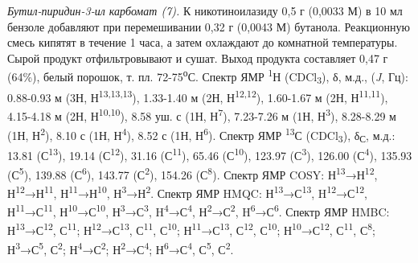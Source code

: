 \emph{Бутил-пиридин-3-ил карбомат (7).} К никотиноилазиду 0,5 г (0,0033
М) в 10 мл бензоле добавляют при перемешивании 0,32 г (0,0043 М)
бутанола. Реакционную смесь кипятят в течение 1 часа, а затем охлаждают
до комнатной температуры. Сырой продукт отфильтровывают и сушат. Выход
продукта составляет 0,47 г (64\%), белый порошок, т. пл.
72-75\textsuperscript{о}С. Спектр ЯМР \textsuperscript{1}Н
(CDCl\textsubscript{3}), δ, м.д., (\emph{J}, Гц): 0.88-0.93 м (3Н,
Н\textsuperscript{13,13,13}), 1.33-1.40 м (2Н,
Н\textsuperscript{12,12}), 1.60-1.67 м (2Н, Н\textsuperscript{11,11}),
4.15-4.18 м (2Н, Н\textsuperscript{10,10}), 8.58 уш. с (1Н,
Н\textsuperscript{7}), 7.23-7.26 м (1Н, Н\textsuperscript{3}), 8.28-8.29
м (1Н, Н\textsuperscript{2}), 8.10 с (1Н, Н\textsuperscript{4}), 8.52 с
(1Н, Н\textsuperscript{6}). Спектр ЯМР \textsuperscript{13}С
(CDCl\textsubscript{3}), δ\textsubscript{С}, м.д.: 13.81
(С\textsuperscript{13}), 19.14 (С\textsuperscript{12}), 31.16
(С\textsuperscript{11}), 65.46 (С\textsuperscript{10}), 123.97
(С\textsuperscript{3}), 126.00 (С\textsuperscript{4}), 135.93
(С\textsuperscript{5}), 139.88 (С\textsuperscript{6}), 143.77
(С\textsuperscript{2}), 154.26 (С\textsuperscript{8}). Спектр ЯМР COSY:
Н\textsuperscript{13}→Н\textsuperscript{12},
Н\textsuperscript{12}→Н\textsuperscript{11},
Н\textsuperscript{11}→Н\textsuperscript{10},
Н\textsuperscript{3}→Н\textsuperscript{2}. Спектр ЯМР HMQC:
Н\textsuperscript{13}→С\textsuperscript{13},
H\textsuperscript{12}→С\textsuperscript{12},
Н\textsuperscript{11}→С\textsuperscript{11},
Н\textsuperscript{10}→С\textsuperscript{10},
Н\textsuperscript{3}→С\textsuperscript{3},
H\textsuperscript{4}→С\textsuperscript{4},
Н\textsuperscript{2}→С\textsuperscript{2},
H\textsuperscript{6}→С\textsuperscript{6}. Спектр ЯМР HMBC:
Н\textsuperscript{13}→С\textsuperscript{12}, С\textsuperscript{11};
Н\textsuperscript{12}→С\textsuperscript{13}, С\textsuperscript{11},
С\textsuperscript{10}; Н\textsuperscript{11}→С\textsuperscript{13},
С\textsuperscript{12}, С\textsuperscript{10};
Н\textsuperscript{10}→С\textsuperscript{12}, С\textsuperscript{11},
С\textsuperscript{8}; Н\textsuperscript{3}→С\textsuperscript{5},
С\textsuperscript{2}; Н\textsuperscript{4}→С\textsuperscript{2};
Н\textsuperscript{2}→С\textsuperscript{4};
Н\textsuperscript{6}→С\textsuperscript{4}, С\textsuperscript{5},
С\textsuperscript{2}.

